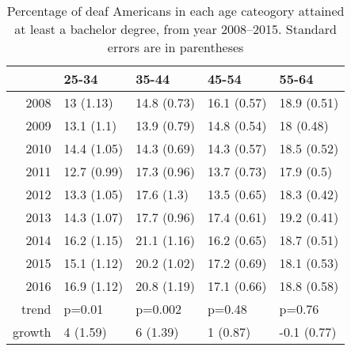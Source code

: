 \documentclass{article}\usepackage[]{graphicx}\usepackage[]{color}
\begin{document}
\begin{table}[ht]
\centering
\begin{tabular}{rllll}
  \hline
 & 25-34 & 35-44 & 45-54 & 55-64 \\
  \hline
2008 & 13 (1.13) & 14.8 (0.73) & 16.1 (0.57) & 18.9 (0.51) \\
  2009 & 13.1 (1.1) & 13.9 (0.79) & 14.8 (0.54) & 18 (0.48) \\
  2010 & 14.4 (1.05) & 14.3 (0.69) & 14.3 (0.57) & 18.5 (0.52) \\
  2011 & 12.7 (0.99) & 17.3 (0.96) & 13.7 (0.73) & 17.9 (0.5) \\
  2012 & 13.3 (1.05) & 17.6 (1.3) & 13.5 (0.65) & 18.3 (0.42) \\
  2013 & 14.3 (1.07) & 17.7 (0.96) & 17.4 (0.61) & 19.2 (0.41) \\
  2014 & 16.2 (1.15) & 21.1 (1.16) & 16.2 (0.65) & 18.7 (0.51) \\
  2015 & 15.1 (1.12) & 20.2 (1.02) & 17.2 (0.69) & 18.1 (0.53) \\
  2016 & 16.9 (1.12) & 20.8 (1.19) & 17.1 (0.66) & 18.8 (0.58) \\
  trend & p=0.01 & p=0.002 & p=0.48 & p=0.76 \\
  growth & 4 (1.59) & 6 (1.39) & 1 (0.87) & -0.1 (0.77) \\
   \hline
\end{tabular}
\caption{Percentage of deaf Americans in each age cateogory attained at least a bachelor degree, from year 2008--2015. Standard errors are in parentheses}
\label{tab:deafAgeTime}
\end{table}
\end{document}
